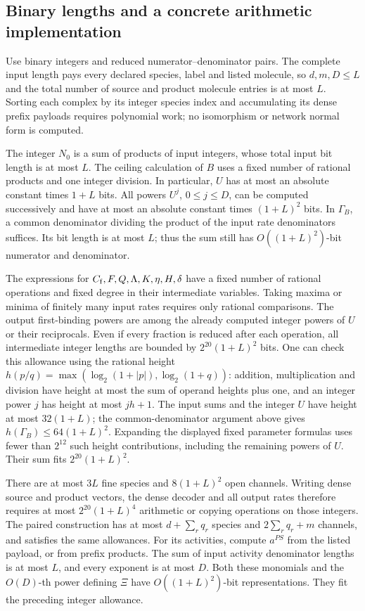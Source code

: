 \documentclass[11pt,reqno]{amsart}
\theoremstyle{definition}
\theoremstyle{remark}
\begin{document}
\subsection{Binary lengths and a concrete arithmetic implementation}\label{app:binary}
Use binary integers and reduced numerator--denominator pairs. The complete
input length pays every declared species, label and listed molecule, so
$d,m,D\le L$ and the total number of source and product molecule entries is
at most $L$. Sorting each complex by its integer species index and accumulating
its dense prefix payloads requires polynomial work; no isomorphism or network
normal form is computed.

The integer $N_0$ is a sum of products of input integers, whose total input
bit length is at most $L$. The ceiling calculation of $B$ uses a fixed number
of rational products and one integer division. In particular, $U$ has at most
an absolute constant times $1+L$ bits. All powers $U^j$, $0\le j\le D$, can
be computed successively and have at most an absolute constant times
$(1+L)^2$ bits. In $\Gamma_B$, a common denominator dividing the product of
the input rate denominators suffices. Its bit length is at most $L$; thus the
sum still has $O((1+L)^2)$-bit numerator and denominator.

The expressions for $C_{\rm f},F,Q,\Lambda,K,\eta,H,\delta$ have a fixed
number of rational operations and fixed degree in their intermediate
variables. Taking maxima or minima of finitely many input rates requires
only rational comparisons. The output first-binding powers are among the
already computed integer powers of $U$ or their reciprocals. Even if every
fraction is reduced after each operation, all intermediate integer lengths
are bounded by $2^{20}(1+L)^2$ bits. One can check this allowance using the rational height
$h(p/q)=\max(\log_2(1+|p|),\log_2(1+q))$: addition, multiplication and
division have height at most the sum of operand heights plus one, and an
integer power $j$ has height at most $j h+1$. The input sums and the integer
$U$ have height at most $32(1+L)$; the common-denominator argument above gives
$h(\Gamma_B)\le64(1+L)^2$. Expanding the displayed fixed parameter formulas
uses fewer than $2^{12}$ such height contributions, including the remaining
powers of $U$. Their sum fits $2^{20}(1+L)^2$.

There are at most $3L$ fine species and $8(1+L)^2$ open channels. Writing dense
source and product vectors, the dense decoder and all output rates therefore
requires at most $2^{20}(1+L)^4$ arithmetic or copying operations on those
integers. The paired construction has at most $d+\sum_rq_r$ species and
$2\sum_rq_r+m$ channels, and satisfies the same allowances. For its activities,
compute $a^{PS}$ from the listed payload, or from prefix products. The sum of
input activity denominator lengths is at most $L$, and every exponent is at
most $D$. Both these monomials and the $O(D)$-th power defining $\Xi$ have
$O((1+L)^2)$-bit representations. They fit the preceding integer allowance.
\end{document}
